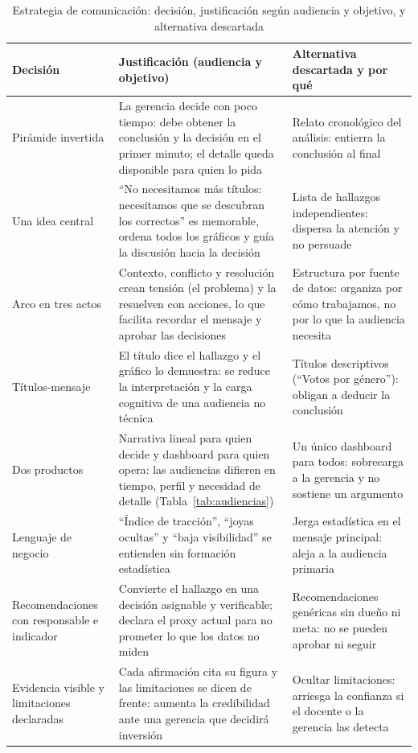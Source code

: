 \documentclass[conference,a4paper]{IEEEtran}
\begin{document}
\begin{table}[!t]
\caption{Estrategia de comunicación: decisión, justificación según audiencia y objetivo, y alternativa descartada}
\label{tab:estrategia}
\centering\footnotesize
\begin{tabularx}{\textwidth}{@{}P{3.0cm}LP{4.6cm}@{}}
\toprule
Decisión & Justificación (audiencia y objetivo) & Alternativa descartada y por qué\\
\midrule
Pirámide invertida & La gerencia decide con poco tiempo: debe obtener la conclusión y la decisión en el primer minuto; el detalle queda disponible para quien lo pida & Relato cronológico del análisis: entierra la conclusión al final\\
Una idea central & ``No necesitamos más títulos: necesitamos que se descubran los correctos'' es memorable, ordena todos los gráficos y guía la discusión hacia la decisión & Lista de hallazgos independientes: dispersa la atención y no persuade\\
Arco en tres actos & Contexto, conflicto y resolución crean tensión (el problema) y la resuelven con acciones, lo que facilita recordar el mensaje y aprobar las decisiones & Estructura por fuente de datos: organiza por cómo trabajamos, no por lo que la audiencia necesita\\
Títulos-mensaje~\cite{knaflic2015} & El título dice el hallazgo y el gráfico lo demuestra: se reduce la interpretación y la carga cognitiva de una audiencia no técnica & Títulos descriptivos (``Votos por género''): obligan a deducir la conclusión\\
Dos productos & Narrativa lineal para quien decide y dashboard para quien opera: las audiencias difieren en tiempo, perfil y necesidad de detalle (Tabla~\ref{tab:audiencias}) & Un único dashboard para todos: sobrecarga a la gerencia y no sostiene un argumento\\
Lenguaje de negocio & ``Índice de tracción'', ``joyas ocultas'' y ``baja visibilidad'' se entienden sin formación estadística & Jerga estadística en el mensaje principal: aleja a la audiencia primaria\\
Recomendaciones con responsable e indicador & Convierte el hallazgo en una decisión asignable y verificable; declara el proxy actual para no prometer lo que los datos no miden & Recomendaciones genéricas sin dueño ni meta: no se pueden aprobar ni seguir\\
Evidencia visible y limitaciones declaradas & Cada afirmación cita su figura y las limitaciones se dicen de frente: aumenta la credibilidad ante una gerencia que decidirá inversión & Ocultar limitaciones: arriesga la confianza si el docente o la gerencia las detecta\\
\bottomrule
\end{tabularx}
\end{table}
\end{document}
